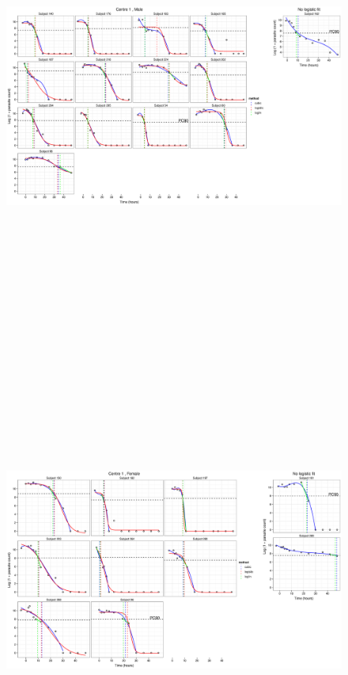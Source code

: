 \begin{figure}
\includegraphics[height=150mm]{Afits1M.eps}
\end{figure}
\begin{figure}
\includegraphics[height=150mm]{Afits1F.eps}
\end{figure}
